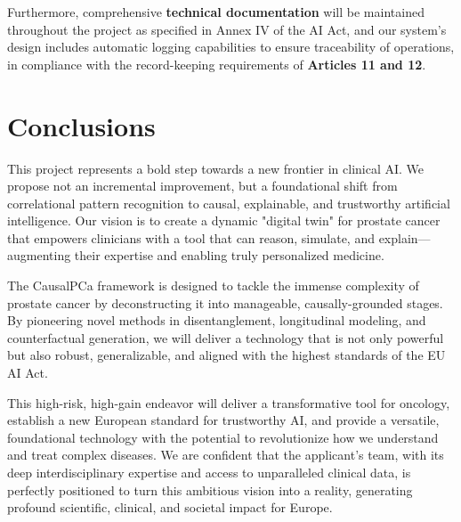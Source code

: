 \documentclass[11pt, a4paper]{article}
\begin{document}
Furthermore, comprehensive \textbf{technical documentation} will be maintained throughout the project as specified in Annex IV of the AI Act, and our system's design includes automatic logging capabilities to ensure traceability of operations, in compliance with the record-keeping requirements of \textbf{Articles 11 and 12}.

\section{Conclusions}
This project represents a bold step towards a new frontier in clinical AI. We propose not an incremental improvement, but a foundational shift from correlational pattern recognition to causal, explainable, and trustworthy artificial intelligence. Our vision is to create a dynamic "digital twin" for prostate cancer that empowers clinicians with a tool that can reason, simulate, and explain—augmenting their expertise and enabling truly personalized medicine.

The CausalPCa framework is designed to tackle the immense complexity of prostate cancer by deconstructing it into manageable, causally-grounded stages. By pioneering novel methods in disentanglement, longitudinal modeling, and counterfactual generation, we will deliver a technology that is not only powerful but also robust, generalizable, and aligned with the highest standards of the EU AI Act.

This high-risk, high-gain endeavor will deliver a transformative tool for oncology, establish a new European standard for trustworthy AI, and provide a versatile, foundational technology with the potential to revolutionize how we understand and treat complex diseases. We are confident that the applicant's team, with its deep interdisciplinary expertise and access to unparalleled clinical data, is perfectly positioned to turn this ambitious vision into a reality, generating profound scientific, clinical, and societal impact for Europe.




\printglossary[type=\acronymtype, title=List of Acronyms]
\end{document}
